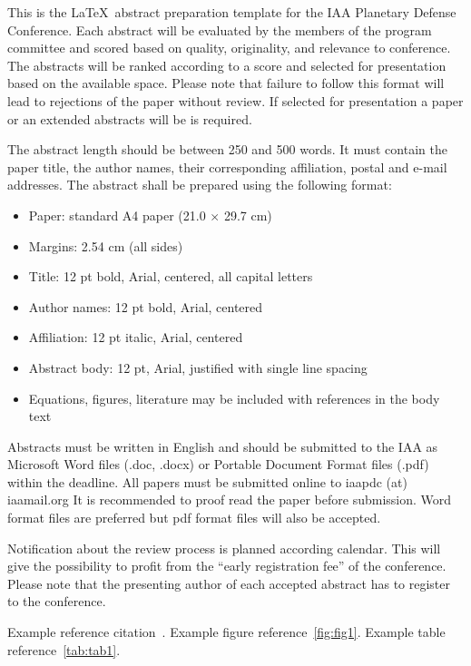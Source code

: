 
This is the \LaTeX~abstract preparation template for the IAA Planetary Defense Conference. Each abstract will be evaluated by the members of the program committee and scored based on quality, originality, and relevance to conference. The abstracts will be ranked according to a score and selected for presentation based on the available space. Please note that failure to follow this format will lead to rejections of the paper without review. If selected for presentation a paper or an extended abstracts will be is required.

The abstract length should be between 250 and 500 words. It must contain the paper title, the author names, their corresponding affiliation, postal and e-mail addresses. The abstract shall be prepared using the following format:

\begin{itemize}
	\item Paper: standard A4 paper (21.0 $\times$ 29.7 cm)
	\item Margins: 2.54 cm (all sides)
	\item Title: 12 pt bold, Arial, centered, all capital letters
	\item Author names: 12 pt bold, Arial, centered
	\item Affiliation: 12 pt italic, Arial, centered
	\item Abstract body: 12 pt, Arial, justified with single line spacing
	\item Equations, figures, literature may be included with references in the body text
\end{itemize}

Abstracts must be written in English and should be submitted to the IAA as Microsoft Word files (.doc, .docx) or Portable Document Format files (.pdf) within the deadline. All papers must be submitted online to iaapdc (at) iaamail.org  It is recommended to proof read the paper before submission. Word format files are preferred but pdf format files will also be accepted.

Notification about the review process is planned according calendar. This will give the possibility to profit from the “early registration fee” of the conference. Please note that the presenting author of each accepted abstract has to register to the conference.

Example reference citation~\cite{SampleRef3}. Example figure reference~\ref{fig:fig1}. Example table reference~\ref{tab:tab1}.

